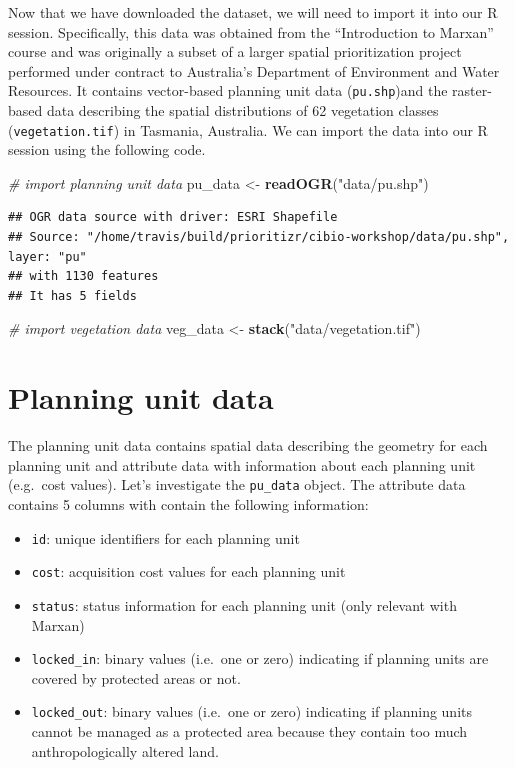 \documentclass[12pt,]{book}
\newenvironment{Shaded}{\begin{snugshade}}{\end{snugshade}}
\newcommand{\KeywordTok}[1]{\textcolor[rgb]{0.13,0.29,0.53}{\textbf{#1}}}
\newcommand{\StringTok}[1]{\textcolor[rgb]{0.31,0.60,0.02}{#1}}
\newcommand{\CommentTok}[1]{\textcolor[rgb]{0.56,0.35,0.01}{\textit{#1}}}
\newcommand{\NormalTok}[1]{#1}
\providecommand{\tightlist}{%
  \setlength{\itemsep}{0pt}\setlength{\parskip}{0pt}}
\begin{document}
Now that we have downloaded the dataset, we will need to import it into
our R session. Specifically, this data was obtained from the
``Introduction to Marxan'' course and was originally a subset of a
larger spatial prioritization project performed under contract to
Australia's Department of Environment and Water Resources. It contains
vector-based planning unit data (\texttt{pu.shp})and the raster-based
data describing the spatial distributions of 62 vegetation classes
(\texttt{vegetation.tif}) in Tasmania, Australia. We can import the data
into our R session using the following code.

\begin{Shaded}
\begin{Highlighting}[]
\CommentTok{# import planning unit data}
\NormalTok{pu_data <-}\StringTok{ }\KeywordTok{readOGR}\NormalTok{(}\StringTok{"data/pu.shp"}\NormalTok{)}
\end{Highlighting}
\end{Shaded}

\begin{verbatim}
## OGR data source with driver: ESRI Shapefile 
## Source: "/home/travis/build/prioritizr/cibio-workshop/data/pu.shp", layer: "pu"
## with 1130 features
## It has 5 fields
\end{verbatim}

\begin{Shaded}
\begin{Highlighting}[]
\CommentTok{# import vegetation data}
\NormalTok{veg_data <-}\StringTok{ }\KeywordTok{stack}\NormalTok{(}\StringTok{"data/vegetation.tif"}\NormalTok{)}
\end{Highlighting}
\end{Shaded}

\section{Planning unit data}\label{planning-unit-data}

The planning unit data contains spatial data describing the geometry for
each planning unit and attribute data with information about each
planning unit (e.g.~cost values). Let's investigate the
\texttt{pu\_data} object. The attribute data contains 5 columns with
contain the following information:

\begin{itemize}
\tightlist
\item
  \texttt{id}: unique identifiers for each planning unit
\item
  \texttt{cost}: acquisition cost values for each planning unit
\item
  \texttt{status}: status information for each planning unit (only
  relevant with Marxan)
\item
  \texttt{locked\_in}: binary values (i.e.~one or zero) indicating if
  planning units are covered by protected areas or not.
\item
  \texttt{locked\_out}: binary values (i.e.~one or zero) indicating if
  planning units cannot be managed as a protected area because they
  contain too much anthropologically altered land.
\end{itemize}
\end{document}
